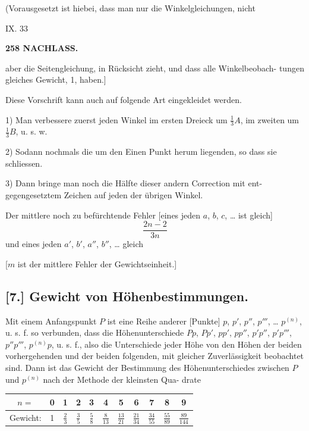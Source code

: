 \documentclass[12pt,a4paper]{article}
\theoremstyle{plain}
\theoremstyle{definition}
\theoremstyle{remark}
\begin{document}
(Vorausgesetzt ist hiebei, dass man nur die Winkelgleichungen, nicht

\hfill IX. 33


\newpage

\noindent\textbf{258 NACHLASS.}

aber die Seitengleichung, in R\"ucksicht zieht, und dass alle Winkelbeobach-
tungen gleiches Gewicht, 1, haben.]

Diese Vorschrift kann auch auf folgende Art eingekleidet werden.

1) Man verbessere zuerst jeden Winkel im ersten Dreieck um $\frac{1}{3}A$, im
zweiten um $\frac{1}{3}B$, u. s. w.

2) Sodann nochmals die um den Einen Punkt herum liegenden, so dass
sie schliessen.

3) Dann bringe man noch die H\"alfte dieser andern Correction mit ent-
gegengesetztem Zeichen auf jeden der \"ubrigen Winkel.

Der mittlere noch zu bef\"urchtende Fehler [eines jeden $a$, $b$, $c$, \ldots{} ist
gleich]
\[
\frac{2n - 2}{3n}
\]
{und eines jeden $a'$, $b'$, $a''$, $b''$, \ldots{} gleich}

[$m$ ist der mittlere Fehler der Gewichtseinheit.]

\subsection*{[7.] Gewicht von H\"ohenbestimmungen.}

Mit einem Anfangspunkt $P$ ist eine Reihe anderer [Punkte] $p$, $p'$, $p''$,
$p'''$, \ldots{} $p^{(n)}$, u. s. f. so verbunden, dass die H\"ohenunterschiede $Pp$, $Pp'$, $pp'$,
$pp''$, $p'p''$, $p'p'''$, $p''p'''$, $p^{(n)}p$, u. s. f., also die Unterschiede jeder H\"ohe von den
H\"ohen der beiden vorhergehenden und der beiden folgenden, mit gleicher
Zuverl\"assigkeit beobachtet sind. Dann ist das Gewicht der Bestimmung des
H\"ohenunterschiedes zwischen $P$ und $p^{(n)}$ nach der Methode der kleinsten Qua-
drate

\begin{center}
\begin{tabular}{c|cccccccccc}
$n =$ & 0 & 1 & 2 & 3 & 4 & 5 & 6 & 7 & 8 & 9 \\
\hline
Gewicht: & 1 & $\frac{2}{3}$ & $\frac{3}{5}$ & $\frac{5}{8}$ & $\frac{8}{13}$ & $\frac{13}{21}$ & $\frac{21}{34}$ & $\frac{34}{55}$ & $\frac{55}{89}$ & $\frac{89}{144}$
\end{tabular}
\end{center}
\end{document}
